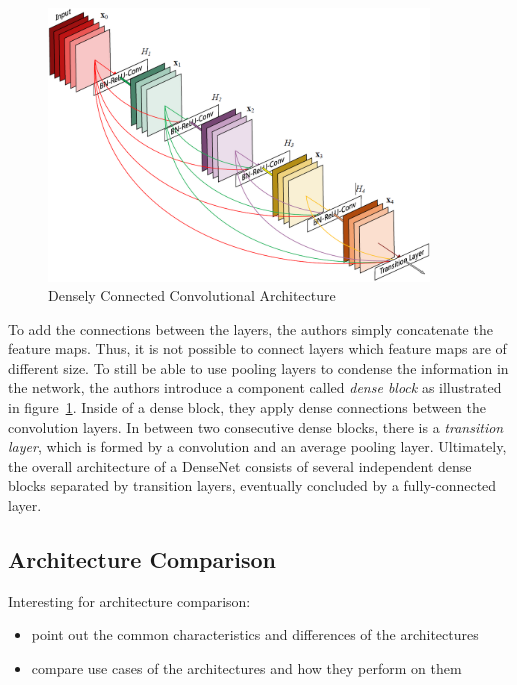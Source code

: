 \begin{figure}[h]
    \centering
    \includegraphics[width=0.9\textwidth]{images/dense-net-architecture}
    \caption{Densely Connected Convolutional Architecture \cite{densenet18}}
    \label{fig:densenet_architecture}
\end{figure}

To add the connections between the layers, the authors simply concatenate the feature maps. Thus, it is not possible to connect layers which feature maps are of different size. To still be able to use pooling layers to condense the information in the network, the authors introduce a component called \emph{dense block} as illustrated in figure~\ref{fig:densenet_architecture}. Inside of a dense block, they apply dense connections between the convolution layers. In between two consecutive dense blocks, there is a \emph{transition layer}, which is formed by a convolution and an average pooling layer. Ultimately, the overall architecture of a DenseNet consists of several independent dense blocks separated by transition layers, eventually concluded by a fully-connected layer.

\subsection{Architecture Comparison}
Interesting for architecture comparison: \cite{imseg_architecures}

\begin{itemize}
    \item point out the common characteristics and differences of the architectures
    \item compare use cases of the architectures and how they perform on them
\end{itemize}

\newpage